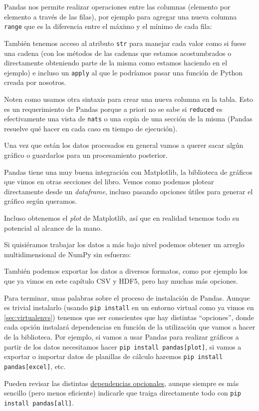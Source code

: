 Pandas nos permite realizar operaciones entre las columnas (elemento por elemento a través de las filas), por ejemplo para agregar una nueva columna \texttt{range} que es la diferencia entre el máximo y el mínimo de cada fila:


También tenemos acceso al atributo \texttt{str} para manejar cada valor como si fuese una cadena (con los métodos de las cadenas que estamos acostumbrados o directamente obteniendo parte de la misma como estamos haciendo en el ejemplo) e incluso un \texttt{apply} al que le podríamos pasar una función de Python creada por nosotros.

Noten como usamos otra sintaxis para crear una nueva columna en la tabla. Esto es un requerimiento de Pandas porque a priori no se sabe si \texttt{reduced} es efectivamente una vista de \texttt{nats} o una copia de una sección de la misma (Pandas resuelve qué hacer en cada caso en tiempo de ejecución).

Una vez que están los datos procesados en general vamos a querer sacar algún gráfico o guardarlos para un procesamiento posterior.

Pandas tiene una muy buena integración con Matplotlib, la biblioteca de gráficos que vimos en otras secciones del libro. Vemos como podemos plotear directamente desde un \textit{dataframe}, incluso pasando opciones útiles para generar el gráfico según queramos.


Incluso obtenemos el \textit{plot} de Matplotlib, así que en realidad tenemos todo su potencial al alcance de la mano.


Si quisiéramos trabajar los datos a más bajo nivel podemos obtener un arreglo multidimensional de NumPy sin esfuerzo:


También podemos exportar los datos a diversos formatos, como por ejemplo los que ya vimos en este capítulo CSV y HDF5, pero hay muchas más opciones.


Para terminar, unas palabras sobre el proceso de instalación de Pandas. Aunque es trivial instalarlo (usando \texttt{pip install} en un entorno virtual como ya vimos en \ref{sec:virtualenvs}) tenemos que ser conscientes que hay distintas ``opciones'', donde cada opción instalará dependencias en función de la utilización que vamos a hacer de la biblioteca. Por ejemplo, si vamos a usar Pandas para realizar gráficos a partir de los datos necesitamos hacer \texttt{pip install pandas[plot]}, si vamos a exportar o importar datos de planillas de cálculo haremos \texttt{pip install pandas[excel]}, etc.

Pueden revisar las distintas \href{https://pandas.pydata.org/docs/getting_started/install.html#optional-dependencies}{dependencias opcionales}, aunque siempre es más sencillo (pero menos eficiente) indicarle que traiga directamente todo con \texttt{pip install pandas[all]}. 
